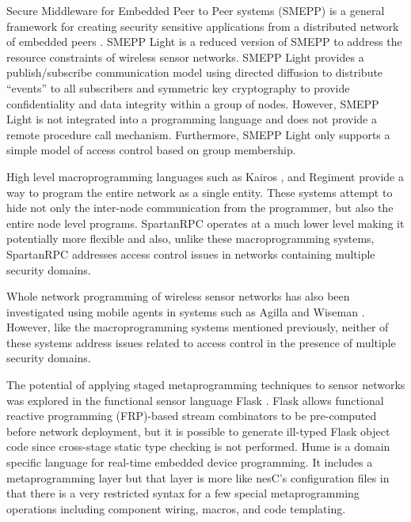 Secure Middleware for Embedded Peer to Peer systems (SMEPP) is a general framework for creating
security sensitive applications from a distributed network of embedded peers
\cite{Brogi:2008:SME:1363370.1363548}. SMEPP Light \cite{Vairo:2008:SMW:1594978.1595054} is a
reduced version of SMEPP to address the resource constraints of wireless sensor networks. SMEPP
Light provides a publish/subscribe communication model using directed diffusion
\cite{intanagonwiwat-2003} to distribute ``events'' to all subscribers and symmetric key
cryptography to provide confidentiality and data integrity within a group of nodes. However,
SMEPP Light is not integrated into a programming language and does not provide a remote
procedure call mechanism. Furthermore, SMEPP Light only supports a simple model of access
control based on group membership.

High level macro\-programming languages such as Kairos \cite{springerlink:10.1007/1150259312},
and Regiment \cite{Newton:2007:RMS:1236360.1236422} provide a way to program the entire network
as a single entity. These systems attempt to hide not only the inter-node communication from the
programmer, but also the entire node level programs. SpartanRPC operates at a much lower level
making it potentially more flexible and also, unlike these macro\-programming systems,
SpartanRPC addresses access control issues in networks containing multiple security domains.

Whole network programming of wireless sensor networks has also been investigated using mobile
agents in systems such as Agilla \cite{Fok:2009:AMA:1552297.1552299} and Wiseman
\cite{Gonzalez-Valenzuela:2010:PMW:1891545.1891566}. However, like the macro\-programming
systems mentioned previously, neither of these systems address issues related to access control
in the presence of multiple security domains.


The potential of applying staged metaprogramming techniques to sensor networks was explored in
the functional sensor language Flask \cite{Mainland-Flask-2008}. Flask allows functional
reactive programming (FRP)-based stream combinators to be pre-computed before network
deployment, but it is possible to generate ill-typed Flask object code since cross-stage static
type checking is not performed. Hume \cite{Hume} is a domain specific language for real-time
embedded device programming. It includes a metaprogramming layer but that layer is more like
nesC's configuration files in that there is a very restricted syntax for a few special
metaprogramming operations including component wiring, macros, and code templating.

